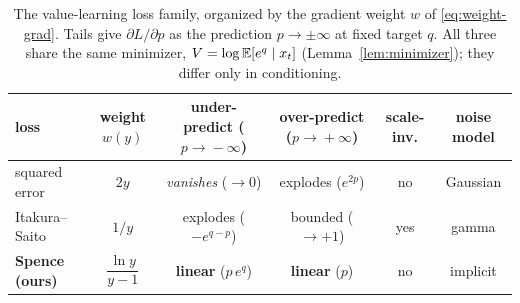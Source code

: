 \begin{table}[t]
\centering
\caption{The value-learning loss family, organized by the gradient weight $w$
of \eqref{eq:weight-grad}. Tails give $\partial L/\partial p$ as the prediction
$p\to\pm\infty$ at fixed target $q$. All three share the same minimizer,
$V=\log\mathbb{E}[e^{q}\mid x_t]$ (Lemma~\ref{lem:minimizer}); they differ only in
conditioning.}
\label{tab:loss-family}
\small
\begin{tabular}{lccccc}
\toprule
loss & weight $w(y)$ & under-predict ($p\!\to\!-\infty$) & over-predict ($p\!\to\!+\infty$)
     & scale-inv. & noise model \\
\midrule
squared error   & $2y$ & \emph{vanishes} ($\to 0$) & explodes ($e^{2p}$) & no  & Gaussian \\
Itakura--Saito  & $1/y$ & explodes ($-e^{q-p}$)    & bounded ($\to +1$)  & yes & gamma \\
\textbf{Spence (ours)} & $\dfrac{\ln y}{y-1}$ & \textbf{linear} ($p\,e^{q}$)
                & \textbf{linear} ($p$) & no & implicit \\
\bottomrule
\end{tabular}
\end{table}
